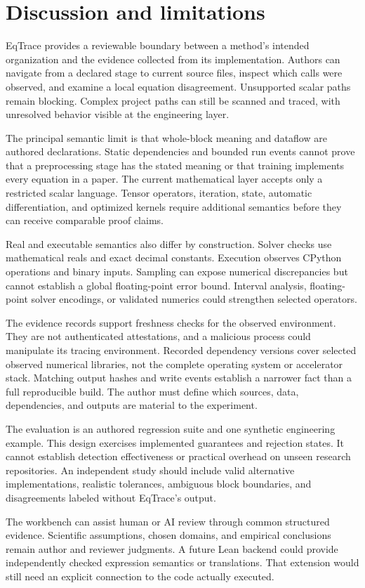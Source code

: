 \section{Discussion and limitations}
\label{sec:discussion}
EqTrace provides a reviewable boundary between a method's intended organization and the evidence collected from its implementation. Authors can navigate from a declared stage to current source files, inspect which calls were observed, and examine a local equation disagreement. Unsupported scalar paths remain blocking. Complex project paths can still be scanned and traced, with unresolved behavior visible at the engineering layer.

The principal semantic limit is that whole-block meaning and dataflow are authored declarations. Static dependencies and bounded run events cannot prove that a preprocessing stage has the stated meaning or that training implements every equation in a paper. The current mathematical layer accepts only a restricted scalar language. Tensor operators, iteration, state, automatic differentiation, and optimized kernels require additional semantics before they can receive comparable proof claims.

Real and executable semantics also differ by construction. Solver checks use mathematical reals and exact decimal constants. Execution observes CPython operations and binary inputs. Sampling can expose numerical discrepancies but cannot establish a global floating-point error bound. Interval analysis, floating-point solver encodings, or validated numerics could strengthen selected operators.

The evidence records support freshness checks for the observed environment. They are not authenticated attestations, and a malicious process could manipulate its tracing environment. Recorded dependency versions cover selected observed numerical libraries, not the complete operating system or accelerator stack. Matching output hashes and write events establish a narrower fact than a full reproducible build. The author must define which sources, data, dependencies, and outputs are material to the experiment.

The evaluation is an authored regression suite and one synthetic engineering example. This design exercises implemented guarantees and rejection states. It cannot establish detection effectiveness or practical overhead on unseen research repositories. An independent study should include valid alternative implementations, realistic tolerances, ambiguous block boundaries, and disagreements labeled without EqTrace's output.

The workbench can assist human or AI review through common structured evidence. Scientific assumptions, chosen domains, and empirical conclusions remain author and reviewer judgments. A future Lean backend could provide independently checked expression semantics or translations. That extension would still need an explicit connection to the code actually executed.
